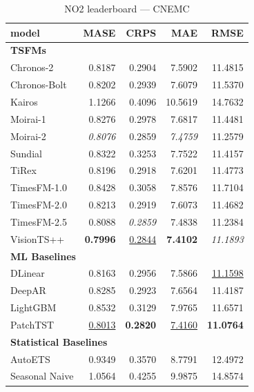 \begin{table}[H]
\caption{NO2 leaderboard --- CNEMC}
\centering
\begin{small}
\begin{tabular}{lrrrr}
\toprule
model & MASE & CRPS & MAE & RMSE \\
\midrule
\multicolumn{5}{l}{\textbf{TSFMs}} \\
Chronos-2 & 0.8187 & 0.2904 & 7.5902 & 11.4815 \\
Chronos-Bolt & 0.8202 & 0.2939 & 7.6079 & 11.5370 \\
Kairos & 1.1266 & 0.4096 & 10.5619 & 14.7632 \\
Moirai-1 & 0.8276 & 0.2978 & 7.6817 & 11.4481 \\
Moirai-2 & \textit{0.8076} & 0.2859 & \textit{7.4759} & 11.2579 \\
Sundial & 0.8322 & 0.3253 & 7.7522 & 11.4157 \\
TiRex & 0.8196 & 0.2918 & 7.6201 & 11.4773 \\
TimesFM-1.0 & 0.8428 & 0.3058 & 7.8576 & 11.7104 \\
TimesFM-2.0 & 0.8213 & 0.2919 & 7.6073 & 11.4682 \\
TimesFM-2.5 & 0.8088 & \textit{0.2859} & 7.4838 & 11.2384 \\
VisionTS++ & \textbf{0.7996} & \underline{0.2844} & \textbf{7.4102} & \textit{11.1893} \\
\midrule
\multicolumn{5}{l}{\textbf{ML Baselines}} \\
DLinear & 0.8163 & 0.2956 & 7.5866 & \underline{11.1598} \\
DeepAR & 0.8285 & 0.2923 & 7.6564 & 11.4187 \\
LightGBM & 0.8532 & 0.3129 & 7.9765 & 11.6571 \\
PatchTST & \underline{0.8013} & \textbf{0.2820} & \underline{7.4160} & \textbf{11.0764} \\
\midrule
\multicolumn{5}{l}{\textbf{Statistical Baselines}} \\
AutoETS & 0.9349 & 0.3570 & 8.7791 & 12.4972 \\
Seasonal Naive & 1.0564 & 0.4255 & 9.9875 & 14.8574 \\
\bottomrule
\end{tabular}
\end{small}
\end{table}